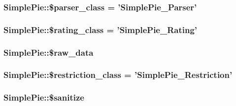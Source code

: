 \hypertarget{class_simple_pie_a1a11ed689e8dfd326660a6d2bf59465c}{
\subsubsection[{\$parser\-\_\-class}]{\setlength{\rightskip}{0pt plus 5cm}Simple\-Pie\-::\$parser\-\_\-class = '{\bf Simple\-Pie\-\_\-\-Parser}'}}\label{class_simple_pie_a1a11ed689e8dfd326660a6d2bf59465c}
\hypertarget{class_simple_pie_a2cd74b9306d0b77e767c2bffee1c45c0}{
\subsubsection[{\$rating\-\_\-class}]{\setlength{\rightskip}{0pt plus 5cm}Simple\-Pie\-::\$rating\-\_\-class = '{\bf Simple\-Pie\-\_\-\-Rating}'}}\label{class_simple_pie_a2cd74b9306d0b77e767c2bffee1c45c0}
\hypertarget{class_simple_pie_a0cbbc5572426f35b5a3b11bd4f4d2303}{
\subsubsection[{\$raw\-\_\-data}]{\setlength{\rightskip}{0pt plus 5cm}Simple\-Pie\-::\$raw\-\_\-data}}\label{class_simple_pie_a0cbbc5572426f35b5a3b11bd4f4d2303}
\hypertarget{class_simple_pie_a5b0f938c21e0e032f0f428c0bd251fda}{
\subsubsection[{\$restriction\-\_\-class}]{\setlength{\rightskip}{0pt plus 5cm}Simple\-Pie\-::\$restriction\-\_\-class = '{\bf Simple\-Pie\-\_\-\-Restriction}'}}\label{class_simple_pie_a5b0f938c21e0e032f0f428c0bd251fda}
\hypertarget{class_simple_pie_a30ff6078e92c9d939a2ac529950f17cb}{
\subsubsection[{\$sanitize}]{\setlength{\rightskip}{0pt plus 5cm}Simple\-Pie\-::\$sanitize}}\label{class_simple_pie_a30ff6078e92c9d939a2ac529950f17cb}
